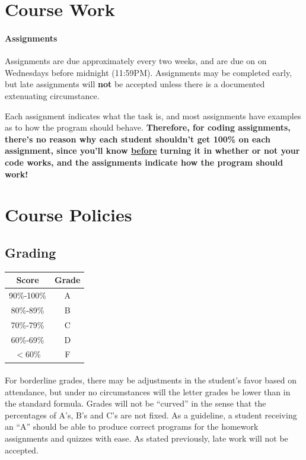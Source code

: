 \documentclass[letter,10pt]{article}
\begin{document}
\section*{Course Work}\label{sec:coursework}
\paragraph{Assignments} Assignments are due approximately every two weeks, and are due on on Wednesdays before midnight (11:59PM). Assignments may be completed early, but late assignments will \textbf{not} be accepted unless there is a documented extenuating circumstance.

Each assignment indicates what the task is, and most assignments have examples as to how the program should behave. \textbf{Therefore, for coding assignments, there's no reason why each student shouldn't get 100\% on each assignment, since you'll know \underline{before} turning it in whether or not your code works, and the assignments indicate how the program should work!}


\section*{Course Policies}
\subsection*{Grading}

\begin{center}
\begin{tabular}{ c c} \\
\textbf{Score} & \textbf{Grade} \\
\hline
90\%-100\% & A \\
80\%-89\% & B \\
70\%-79\% & C \\ 
60\%-69\% & D \\
$<$60\%   & F 
\end{tabular}
\end{center}

\paragraph{}For borderline grades, there may be adjustments in the student's favor based on attendance, but under no circumstances will the letter grades be lower than in the standard formula. Grades will not be ``curved'' in the sense that the percentages of A's, B's and C's are not fixed. As a guideline, a student receiving an ``A'' should be able to produce correct programs for the homework assignments and quizzes with ease. As stated previously, late work will not be accepted.
\end{document}
